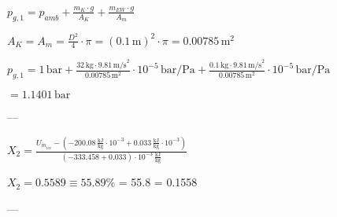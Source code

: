 \( p_{g,1} = p_{amb} + \frac{m_K \cdot g}{A_K} + \frac{m_{EW} \cdot g}{A_m} \)  

\( A_K = A_m = \frac{D^2}{4} \cdot \pi = (0.1 \, \text{m})^2 \cdot \pi = 0.00785 \, \text{m}^2 \)  

\( p_{g,1} = 1 \, \text{bar} + \frac{32 \, \text{kg} \cdot 9.81 \, \text{m/s}^2}{0.00785 \, \text{m}^2} \cdot 10^{-5} \, \text{bar/Pa} + \frac{0.1 \, \text{kg} \cdot 9.81 \, \text{m/s}^2}{0.00785 \, \text{m}^2} \cdot 10^{-5} \, \text{bar/Pa} \)  

\( = 1.1401 \, \text{bar} \)  

---

\( X_2 = \frac{U_{m_{ice}} - (-200.08 \, \frac{\text{kJ}}{\text{kg}} \cdot 10^{-3} + 0.033 \, \frac{\text{kJ}}{\text{kg}} \cdot 10^{-3})}{(-333.458 + 0.033) \cdot 10^{-3} \, \frac{\text{kJ}}{\text{kg}}} \)  

\( X_2 = 0.5589 \equiv 55.89\% \)  
= 55.8%
= 0.1558  

---